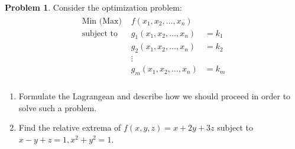 \documentclass[12pt]{article}
\theoremstyle{definition}
\newtheorem{problem}{Problem}
\begin{document}
\begin{problem}
  Consider the optimization problem:
  \begin{align*}
    \begin{array} {lcl}
      \text{Min (Max) } & f(x_1, x_2, \dots, x_n) & \\
      \text{subject to } & g_1(x_1, x_2, \dots, x_n) &= k_1 \\
      & g_2(x_1, x_2, \dots, x_n) &= k_2 \\
      & \vdots & \\
      & g_m(x_1, x_2, \dots, x_n) &= k_m \\
    \end{array}
  \end{align*}
  \begin{enumerate}
    \item Formulate the Lagrangean and describe how we should proceed in order
      to solve such a problem.
    \item Find the relative extrema of $f(x, y, z) = x + 2y + 3z$ subject to
      $x - y + z = 1, x^2 + y^2 = 1$.
  \end{enumerate}
\end{problem}
\end{document}
